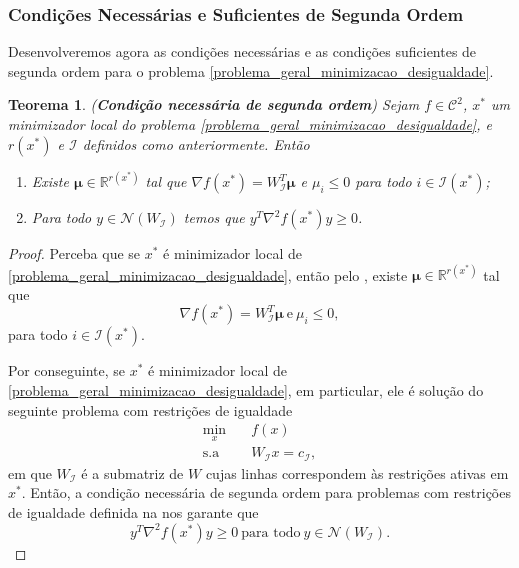 \documentclass[12pt,a4paper]{scrartcl}
\def\RR{\mathds{R}}
\newtheorem{teo}{Teorema}
\theoremstyle{definition}%
\begin{document}
\subsubsection{Condições Necessárias e Suficientes de Segunda Ordem}


Desenvolveremos agora as condições necessárias e as condições suficientes de segunda ordem para o problema \eqref{problema_geral_minimizacao_desigualdade}.

\begin{teo}(\textbf{Condição necessária de segunda ordem}) \label{teo:condicao_necessaria_2ordem_desigualdade}
Sejam $f \in \mathcal{C}^{2}$, $x^{*}$ um minimizador local do problema \eqref{problema_geral_minimizacao_desigualdade}, e $r(x^{*})$ e $\mathcal{I}$ definidos como anteriormente. Então
\begin{enumerate}
	\item[(i)] Existe $\boldsymbol{\mu} \in \RR^{r(x^{*})}$ tal que $\nabla f(x^{*}) = W_{\mathcal{I}}^{T} \boldsymbol{\mu}$ e $\mu_{i} \leq 0$ para todo $i \in \mathcal{I}(x^{*})$;

	\item[(ii)] Para todo $y \in \mathcal{N}(W_{\mathcal{I}})$ temos que $y^{T} \nabla^{2} f(x^{*})y \geq 0$.
\end{enumerate}
\end{teo}
\begin{proof}
Perceba que se $x^{*}$ é minimizador local de \eqref{problema_geral_minimizacao_desigualdade}, então pelo , existe $\boldsymbol{\mu} \in \RR^{r(x^{*})}$ tal que 
\[
\nabla f(x^{*}) = W_{\mathcal{I}}^{T} \boldsymbol{\mu} \ \text{e} \ \mu_{i} \leq 0,
\] 
para todo $i \in \mathcal{I}(x^{*})$.

Por conseguinte, se $x^{*}$ é minimizador local de \eqref{problema_geral_minimizacao_desigualdade}, em particular, ele é solução do seguinte problema com restrições de igualdade
\[ 
\begin{aligned}
\min_{x} & \quad f(x) \\
\text{s.a} & \quad W_{\mathcal{I}}x=c_{\mathcal{I}} ,
\end{aligned}
\]
em que $W_{\mathcal{I}}$ é a submatriz de $W$ cujas linhas correspondem às restrições ativas em $x^{*}$. Então, a condição necessária de segunda ordem para problemas com restrições de igualdade definida na  nos garante que
\[
y^{T}\nabla^{2} f(x^{*})y \geq 0 \ \text{para todo} \ y \in \mathcal{N}(W_{\mathcal{I}}) .
\]
\end{proof}
\end{document}
